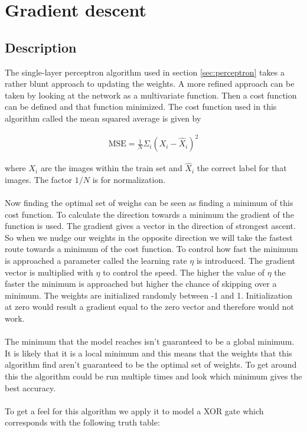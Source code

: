 \documentclass[10 pt, a4paper]{article}
\begin{document}
\section{Gradient descent} \label{sec:gde}

\subsection{Description}

The single-layer perceptron algorithm used in section \ref{sec:perceptron} takes a rather blunt approach to updating the weights. A more refined approach can be taken by looking at the network as a multivariate function. Then a cost function can be defined and that function minimized. The cost function used in this algorithm called the mean squared average is given by

\begin{align}
\mathrm{MSE} = \frac{1}{N} \Sigma_i (X_i - \hat{X}_i)^2
\end{align}

where $X_i$ are the images within the train set and $\hat{X}_i$ the correct label for that images. The factor $1/N$ is for normalization.
\\
\\
Now finding the optimal set of weighs can be seen as finding a minimum of this cost function. To calculate the direction towards a minimum the gradient of the function is used. The gradient gives a vector in the direction of strongest ascent. So when we nudge our weights in the opposite direction we will take the fastest route towards a minimum of the cost function. To control how fast the minimum is approached a parameter called the learning rate $\eta$ is introduced. The gradient vector is multiplied with $\eta$ to control the speed. The higher the value of $\eta$ the faster the minimum is approached but higher the chance of skipping over a minimum. The weights are initialized randomly between -1 and 1. Initialization at zero would result a gradient equal to the zero vector and therefore would not work.
\\
\\
The minimum that the model reaches isn't guaranteed to be a global minimum. It is likely that it is a local minimum and this means that the weights that this algorithm find aren't guaranteed to be the optimal set of weights. To get around this the algorithm could be run multiple times and look which minimum gives the best accuracy.
\\
\\
To get a feel for this algorithm we apply it to model a XOR gate which corresponds with the following truth table:
\end{document}
